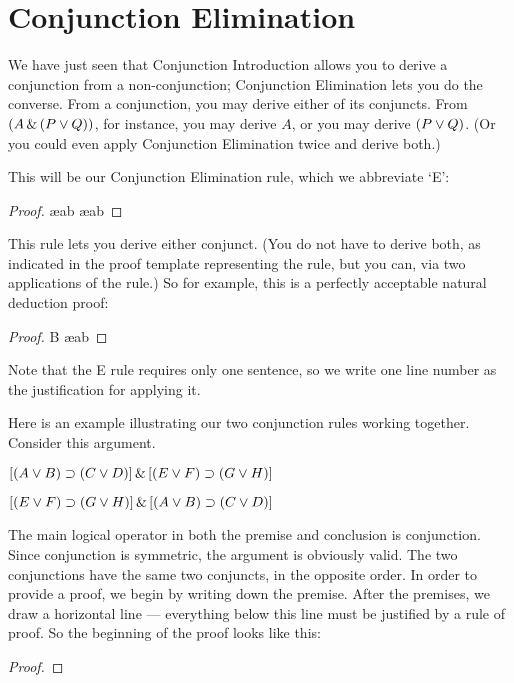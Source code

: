 \section{Conjunction Elimination}

We have just seen that Conjunction Introduction allows you to derive a conjunction from a non-conjunction; Conjunction Elimination lets you do the converse. From a conjunction, you may derive either of its conjuncts. From $(A \,\&\, (P \vee Q))$, for instance, you may derive $A$, or you may derive $(P \vee Q)$. (Or you could even apply Conjunction Elimination twice and derive both.)

This will be our Conjunction Elimination rule, which we abbreviate `{\eand}E':

\begin{proof}
	\metaA{} \ae{ab}
	\metaB{} \ae{ab}
\end{proof}

This rule lets you derive either conjunct. (You do not have to derive both, as indicated in the proof template representing the rule, but you can, via two applications of the rule.) So for example, this is a perfectly acceptable natural deduction proof:

\begin{proof}
	B \ae{ab}
\end{proof}

Note that the {\eand}E rule requires only one sentence, so we write one line number as the justification for applying it.

Here is an example illustrating our two conjunction rules working together. Consider this argument.
\begin{earg}
\item[] $[(A\vee B)\supset(C\vee D)] \,\&\, [(E \vee F) \supset (G\vee H)]$
\item[\therefore] $[(E \vee F) \supset (G\vee H)] \,\&\, [(A\vee B)\supset(C\vee D)]$
\end{earg}
The main logical operator in both the premise and conclusion is conjunction. Since conjunction is symmetric, the argument is obviously valid. The two conjunctions have the same two conjuncts, in the opposite order. In order to provide a proof, we begin by writing down the premise. After the premises, we draw a horizontal line --- everything below this line must be justified by a rule of proof. So the beginning of the proof looks like this:

\begin{proof}
\end{proof}

